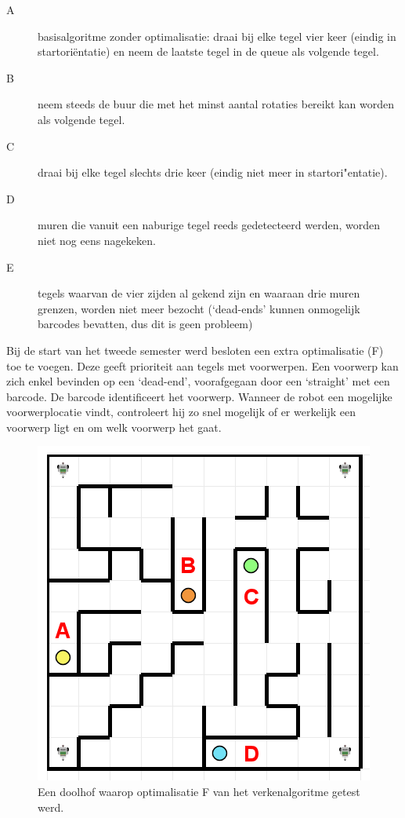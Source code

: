 \documentclass[tt2]{penoverslag}
\begin{document}
\begin{description}
\item[A] basisalgoritme zonder optimalisatie: draai bij elke tegel vier keer (eindig in startori\"entatie) en neem de laatste tegel in de queue als volgende tegel.
\item[B] neem steeds de buur die met het minst aantal rotaties bereikt kan worden als volgende tegel.
\item[C] draai bij elke tegel slechts drie keer (eindig niet meer in startori"entatie).
\item[D] muren die vanuit een naburige tegel reeds gedetecteerd werden, worden niet nog eens nagekeken.
\item[E] tegels waarvan de vier zijden al gekend zijn en waaraan drie muren grenzen, worden niet meer bezocht (`dead-ends' kunnen onmogelijk barcodes bevatten, dus dit is geen probleem)
\end{description}

Bij de start van het tweede semester werd besloten een extra optimalisatie (F) toe te voegen. Deze geeft prioriteit aan tegels met voorwerpen. Een voorwerp kan zich enkel bevinden op een `dead-end', voorafgegaan door een `straight' met een barcode. De barcode identificeert het voorwerp. Wanneer de robot een mogelijke voorwerplocatie vindt, controleert hij zo snel mogelijk of er werkelijk een voorwerp ligt en om welk voorwerp het gaat. \\

\begin{figure}[!hb]
\centering
	\includegraphics[scale=0.5]{doolhof3}
	\caption{Een doolhof waarop optimalisatie F van het verkenalgoritme getest werd.}
\label{doolhof3}
\end{figure}
\end{document}
